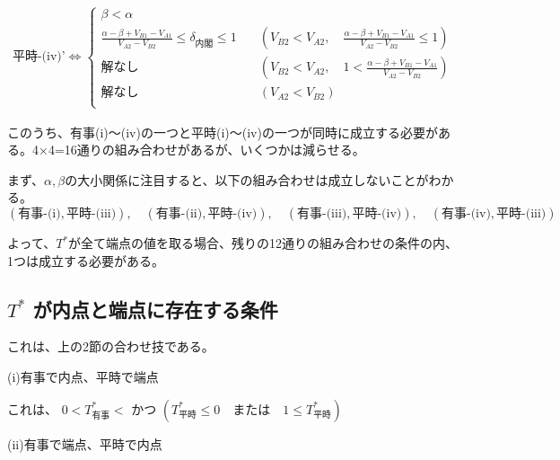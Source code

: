 \documentclass[main.tex]{subfiles}
\begin{document}
\begin{align*}
    \text{平時-(iv)'} \Leftrightarrow 
    \begin{cases}
        \beta < \alpha \\[1em]
        \frac{\alpha-\beta + V_{B1}-V_{A1}}{V_{A2} - V_{B2}} \le \delta_{内閣} \le 1  \quad &( V_{B2} < V_{A2} ,\quad \frac{\alpha-\beta + V_{B1}-V_{A1}}{V_{A2} - V_{B2}} \le 1) \\[1em]
        解なし  \quad &( V_{B2} < V_{A2} ,\quad 1 < \frac{\alpha-\beta + V_{B1}-V_{A1}}{V_{A2} - V_{B2}}) \\[1em]
        解なし \quad &( V_{A2} < V_{B2} )\\[1em]
    \end{cases}
\end{align*}


このうち、有事(i)〜(iv)の一つと平時(i)〜(iv)の一つが同時に成立する必要がある。4×4=16通りの組み合わせがあるが、いくつかは減らせる。

まず、$\alpha, \beta$の大小関係に注目すると、以下の組み合わせは成立しないことがわかる。
$$(\text{有事-(i)}, \text{平時-(iii)}),\quad (\text{有事-(ii)}, \text{平時-(iv)}),\quad (\text{有事-(iii)}, \text{平時-(iv)}),\quad (\text{有事-(iv)}, \text{平時-(iii)})$$

よって、$T^*$が全て端点の値を取る場合、残りの12通りの組み合わせの条件の内、1つは成立する必要がある。





\subsection{$T^*$ が内点と端点に存在する条件}

これは、上の2節の合わせ技である。

(i)有事で内点、平時で端点 

これは、
$0 < T^*_{有事} < $ かつ $(T^*_{平時} \le 0 \quad{または}\quad 1 \le T^*_{平時})$


(ii)有事で端点、平時で内点

\theendnotes %
\end{document}
